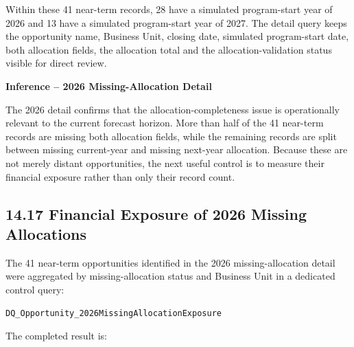 \documentclass[11pt,a4paper]{article}
\begin{document}
Within these 41 near-term records, 28 have a simulated program-start year of
2026 and 13 have a simulated program-start year of 2027. The detail query keeps
the opportunity name, Business Unit, closing date, simulated program-start date,
both allocation fields, the allocation total and the allocation-validation
status visible for direct review.

\begin{inferencebox}

\textbf{Inference -- 2026 Missing-Allocation Detail}

The 2026 detail confirms that the allocation-completeness issue is operationally
relevant to the current forecast horizon. More than half of the 41 near-term
records are missing both allocation fields, while the remaining records are
split between missing current-year and missing next-year allocation. Because
these are not merely distant opportunities, the next useful control is to
measure their financial exposure rather than only their record count.

\end{inferencebox}

\subsection{14.17 Financial Exposure of 2026 Missing Allocations}

The 41 near-term opportunities identified in the 2026 missing-allocation detail
were aggregated by missing-allocation status and Business Unit in a dedicated
control query:

\begin{lstlisting}[style=powerquery]
DQ_Opportunity_2026MissingAllocationExposure
\end{lstlisting}

The completed result is:
\end{document}
